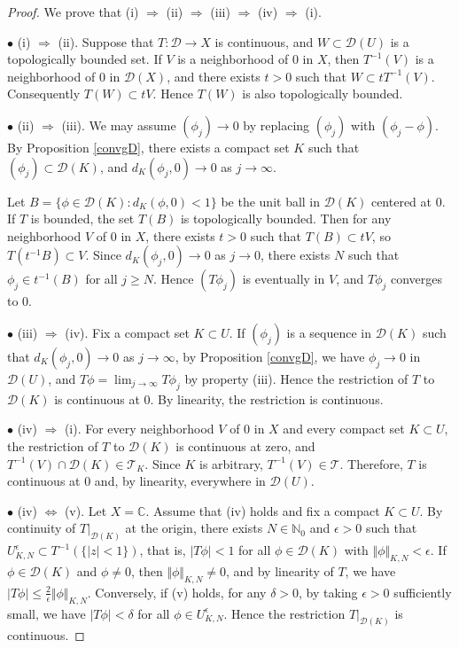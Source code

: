 \documentclass{article}
\numberwithin{equation}{section}
\newcommand{\bbC}{\mathbb{C}}
\newcommand{\bbN}{\mathbb{N}}
\newcommand{\scr}{\mathscr}
\renewcommand{\cal}{\mathcal}
\theoremstyle{plain}
\theoremstyle{definition}
\begin{document}
\begin{proof}
We prove that (i) $\Rightarrow$ (ii) $\Rightarrow$ (iii) $\Rightarrow$ (iv) $\Rightarrow$ (i).
\item$\bullet$ (i) $\Rightarrow$ (ii). Suppose that $T:\cal{D}\to X$ is continuous, and $W\subset \cal{D}(U)$ is a topologically bounded set. If $V$ is a neighborhood of $0$ in $X$, then $T^{-1}(V)$ is a neighborhood of $0$ in $\cal{D}(X)$, and there exists $t>0$ such that $W\subset tT^{-1}(V)$. Consequently $T(W)\subset tV$. Hence $T(W)$ is also topologically bounded.

\item$\bullet$ (ii) $\Rightarrow$ (iii). We may assume $(\phi_j)\to 0$ by replacing $(\phi_j)$ with $(\phi_j-\phi)$. By Proposition \ref{convgD}, there exists a compact set $K$ such that $(\phi_j)\subset\cal{D}(K)$, and $d_K(\phi_j,0)\to 0$ as $j\to\infty$. 

Let $B=\{\phi\in\cal{D}(K):d_K(\phi,0)<1\}$ be the unit ball in $\cal{D}(K)$ centered at $0$. If $T$ is bounded, the set $T(B)$ is topologically bounded. Then for any neighborhood $V$ of $0$ in $X$, there exists $t>0$ such that $T(B)\subset tV$, so $T(t^{-1}B)\subset V$. Since $d_K(\phi_j,0)\to 0$ as $j\to 0$, there exists $N$ such that $\phi_j\in t^{-1}(B)$ for all $j\geq N$. Hence $(T\phi_j)$ is eventually in $V$, and $T\phi_j$ converges to $0$.

\item$\bullet$ (iii) $\Rightarrow$ (iv). Fix a compact set $K\subset U$. If $(\phi_j)$ is a sequence in $\cal{D}(K)$ such that $d_K(\phi_j,0)\to 0$ as $j\to\infty$, by Proposition \ref{convgD}, we have $\phi_j\to 0$ in $\cal{D}(U)$, and $T\phi=\lim_{j\to\infty}T\phi_j$ by property (iii). Hence the restriction of $T$ to $\cal{D}(K)$ is continuous at $0$. By linearity, the restriction is continuous.

\item$\bullet$ (iv) $\Rightarrow$ (i). For every neighborhood $V$ of $0$ in $X$ and every compact set $K\subset U$, the restriction of $T$ to $\cal{D}(K)$ is continuous at zero, and $T^{-1}(V)\cap\cal{D}(K)\in\scr{T}_K$. Since $K$ is arbitrary, $T^{-1}(V)\in\mathscr{T}$. Therefore, $T$ is continuous at $0$ and, by linearity, everywhere in $\cal{D}(U)$.

\item$\bullet$ (iv) $\Leftrightarrow$ (v). Let $X=\bbC$. Assume that (iv) holds and fix a compact $K\subset U$. By continuity of $T|_{\cal{D}(K)}$ at the origin, there exists $N\in\bbN_0$ and $\epsilon>0$ such that $U_{K,N}^\epsilon\subset  T^{-1}(\{\vert z\vert<1\})$, that is, $\vert T\phi\vert<1$ for all $\phi\in\cal{D}(K)$ with $\Vert\phi\Vert_{K,N}<\epsilon$. If $\phi\in\cal{D}(K)$ and $\phi\neq 0$, then $\Vert\phi\Vert_{K,N}\neq 0$, and by linearity of $T$, we have $\vert T\phi\vert\leq\frac{2}{\epsilon}\Vert\phi\Vert_{K,N}$. Conversely, if (v) holds, for any $\delta>0$, by taking $\epsilon>0$ sufficiently small, we have $\vert T\phi\vert<\delta$ for all $\phi\in U_{K,N}^\epsilon$. Hence the restriction $T|_{\cal{D}(K)}$ is continuous.
\end{proof}
\end{document}
